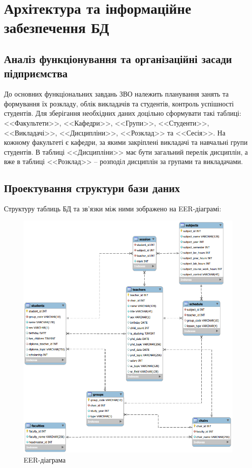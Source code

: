 \newpage
\chapter{Архітектура та інформаційне забезпечення БД}
\section{Аналіз функціонування та організаційні засади підприємства}
До основних функціональних завдань ЗВО належить планування занять та формування їх розкладу,
облік викладачів та студентів, контроль успішності студентів.
Для зберігання необхідних даних доцільно сформувати такі таблиці:
<<Факультети>>, <<Кафедри>>, <<Групи>>, <<Студенти>>, <<Викладачі>>, 
<<Дисципліни>>, <<Розклад>> та <<Сесія>>. На кожному факультеті є кафедри,
за якими закріплені викладачі та навчальні групи студентів. В таблиці <<Дисципліни>>
має бути загальний перелік дисциплін, а вже в таблиці <<Розклад>> -- розподіл
дисциплін за групами та викладачами.

\section{Проектування структури бази даних}
Структуру таблиць БД та зв'язки між ними зображено на EER-діаграмі:
\begin{figure}[h]
    \centering
    \includegraphics[scale=0.8]{pics/eer.png}
    \caption{EER-діаграма}
\end{figure}